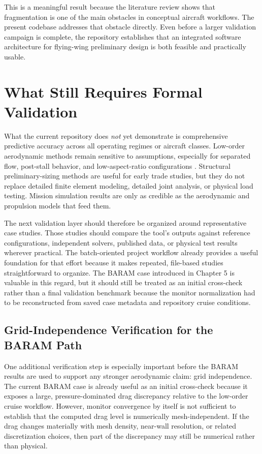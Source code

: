 \documentclass[12pt]{report}
\begin{document}
This is a meaningful result because the literature review shows that fragmentation is one of the main obstacles in conceptual aircraft workflows. The present codebase addresses that obstacle directly. Even before a larger validation campaign is complete, the repository establishes that an integrated software architecture for flying-wing preliminary design is both feasible and practically usable.

\section{What Still Requires Formal Validation}
What the current repository does \emph{not} yet demonstrate is comprehensive predictive accuracy across all operating regimes or aircraft classes. Low-order aerodynamic methods remain sensitive to assumptions, especially for separated flow, post-stall behavior, and low-aspect-ratio configurations \cite{Yu2022ICAS,RosasCordova2024VSPAERO}. Structural preliminary-sizing methods are useful for early trade studies, but they do not replace detailed finite element modeling, detailed joint analysis, or physical load testing. Mission simulation results are only as credible as the aerodynamic and propulsion models that feed them.

The next validation layer should therefore be organized around representative case studies. Those studies should compare the tool's outputs against reference configurations, independent solvers, published data, or physical test results wherever practical. The batch-oriented project workflow already provides a useful foundation for that effort because it makes repeated, file-based studies straightforward to organize. The BARAM case introduced in Chapter 5 is valuable in this regard, but it should still be treated as an initial cross-check rather than a final validation benchmark because the monitor normalization had to be reconstructed from saved case metadata and repository cruise conditions.

\subsection{Grid-Independence Verification for the BARAM Path}
One additional verification step is especially important before the BARAM results are used to support any stronger aerodynamic claim: grid independence. The current BARAM case is already useful as an initial cross-check because it exposes a large, pressure-dominated drag discrepancy relative to the low-order cruise workflow. However, monitor convergence by itself is not sufficient to establish that the computed drag level is numerically mesh-independent. If the drag changes materially with mesh density, near-wall resolution, or related discretization choices, then part of the discrepancy may still be numerical rather than physical.
\end{document}
